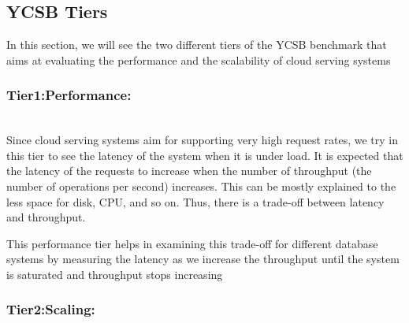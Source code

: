 \documentclass[sigconf,10pt]{acmart}
\begin{document}
\subsection{YCSB Tiers}
In this section, we will see the two different tiers of the YCSB benchmark that aims at  evaluating   the performance and the scalability of cloud serving systems 
\subsubsection{\textbf{Tier1:Performance:}} \hfill\\
Since cloud serving systems aim for supporting very high request rates, we try in this tier to see the latency of the system when it is under load. It is expected that the latency of the requests to increase when the number of throughput (the number of operations per second) increases. This can be mostly explained to the less space for disk, CPU, and so on. Thus, there is a trade-off between latency and throughput.


This performance tier helps in  examining  this trade-off for different database systems by measuring the latency as we increase the throughput until the system is saturated and throughput stops increasing 
\subsubsection{\textbf{Tier2:Scaling:}} \hfill\\ 
\end{document}
